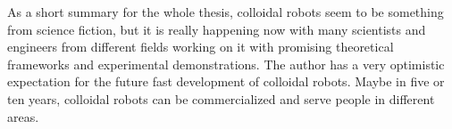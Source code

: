 As a short summary for the whole thesis, colloidal robots seem to be something from science fiction, but it is really happening now with many scientists and engineers from different fields working on it with promising theoretical frameworks and experimental demonstrations. The author has a very optimistic expectation for the future fast development of colloidal robots. Maybe in five or ten years, colloidal robots can be commercialized and serve people in different areas.  


